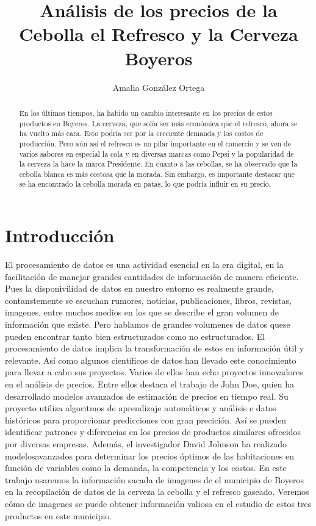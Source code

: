 \documentclass[]{article}
\begin{document}
	

\title{Análisis de los precios de la Cebolla el Refresco y la Cerveza Boyeros}
\author{Amalia González Ortega}
\maketitle
\begin{abstract}
    En los últimos tiempos, ha habido un cambio interesante en los precios de estos productos en Boyeros. La cerveza, que solía ser más económica que el refresco, ahora se ha vuelto más cara. Esto podría ser por la creciente demanda y los costos de producción. Pero aún así el refresco es un pilar importante en el comercio y se ven de varios sabores en especial la cola y en diversas marcas como Pepsi y la popularidad de la cerveza la hace la marca Presidente. En cuanto a las cebollas, se ha observado que la cebolla blanca es más costosa que la morada. Sin embargo, es importante destacar que se ha encontrado la cebolla morada en patas, lo que podría influir en su precio.   
\end{abstract}

\section{Introducción}\label{sec:intro}
El procesamiento de datos es una actividad esencial en la era digital, en la facilitación de manejar grandes cantidades de información de manera eficiente. Pues la disponivilidad de datos en nuestro entorno es realmente grande, contanstemente se escuchan rumores, noticias, publicaciones, libros, revistas, imagenes, entre muchos medios en los que se describe el gran volumen de información que existe. Pero hablamos de grandes volumenes de datos quese pueden encontrar tanto bien estructurados como no estructurados. El procesamiento de datos implica la transformación de estos en información útil y relevante.
Así como algunos científicos de datos han llevado este conocimiento para llevar a cabo sus proyectos. Varios de ellos han echo proyectos innovadores en el análisis de precios. Entre ellos destaca el trabajo de John Doe, quien ha desarrollado modelos avanzados de estimación de precios en tiempo real. Su proyecto utiliza algoritmos de aprendizaje automáticos y análisis e datos históricos para proporcionar predicciones con gran precición. Así se pueden identificar patrones y diferencias en los precios de productos similares ofrecidos por diversas empresas. Además, el investigador David Johnson ha realizado modelosavanzados para determinar los precios óptimos de las habitaciones en función de variables como la demanda, la competencia y los costos.  
 En este trabajo usaremos la información sacada de imagenes de el municipio de Boyeros en la recopilación de datos de la cerveza la cebolla y el refresco gaseado. Veremos cómo de imagenes se puede obtener información valiosa en el estudio de estos tres productos en este municipio.
 
\end{document}
